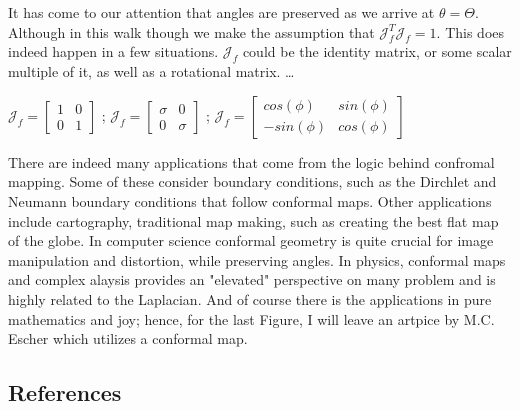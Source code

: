 \documentclass[a4paper,man,natbib]{apa6}
\begin{document}
It has come to our attention that angles are preserved as we arrive at $ \theta = \Theta $.
Although in this walk though we make the assumption that $ \mathcal{J}_f^T\mathcal{J}_f = 1 $. 
This does indeed happen in a few situations. $ \mathcal{J}_f $ could be the identity matrix, or some scalar multiple of it, as well as a rotational matrix. \dots

\begin{center}

$ \mathcal{J}_f = \begin{bmatrix}
        1 & 0\\
        0 & 1
\end{bmatrix} $ ;
$ \mathcal{J}_f = \begin{bmatrix}
      \sigma  & 0\\
      0 & \sigma 
\end{bmatrix} $ ;
$ \mathcal{J}_f = \begin{bmatrix}
      cos(\phi) & sin(\phi)\\
      -sin(\phi) & cos(\phi)
\end{bmatrix} $

\end{center}

There are indeed many applications that come from the logic behind confromal mapping. 
Some of these consider boundary conditions, such as the Dirchlet and Neumann boundary conditions that follow conformal maps. 
Other applications include cartography, traditional map making, such as creating the best flat map of the globe. 
In computer science conformal geometry is quite crucial for image manipulation and distortion, while preserving angles. 
In physics, conformal maps and complex alaysis provides an "elevated" perspective on many problem and is highly related to the Laplacian. 
And of course there is the applications in pure mathematics and joy; hence, for the last Figure, I will leave an artpice by M.C. Escher which utilizes a conformal map. 

\newpage
\subsection{References}
\end{document}
